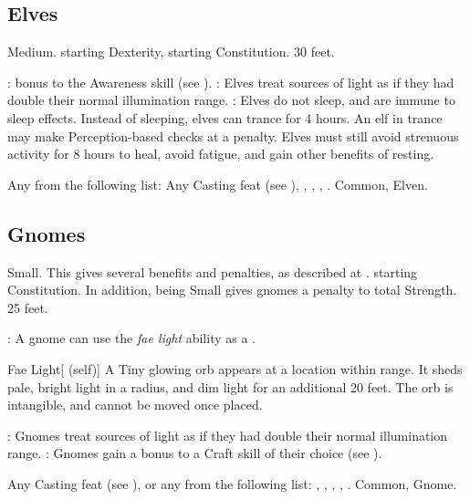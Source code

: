\subsection{Elves}
 Medium.
  starting Dexterity,  starting Constitution.
 30 feet.
\begin{itemize}
    :  bonus to the Awareness skill (see ).
    : Elves treat sources of light as if they had double their normal illumination range.
    : Elves do not sleep, and are immune to sleep effects. Instead of sleeping, elves can trance for 4 hours. An elf in trance may make Perception-based checks at a  penalty. Elves must still avoid strenuous activity for 8 hours to heal, avoid fatigue, and gain other benefits of resting.
\end{itemize}
 Any from the following list: Any Casting feat (see ), , , , .
 Common, Elven.

\subsection{Gnomes}
 Small. This gives several benefits and penalties, as described at .
  starting Constitution. In addition, being Small gives gnomes a  penalty to total Strength.
 25 feet.
\begin{itemize}
    : A gnome can use the \textit{fae light} ability as a .
        \begin{attuneability}{Fae Light}[ (self)]
            A Tiny glowing orb appears at a location within \rngmed range.
            It sheds pale, bright light in a \areamed radius, and dim light for an additional 20 feet.
            The orb is intangible, and cannot be moved once placed.
        \end{attuneability}
    : Gnomes treat sources of light as if they had double their normal illumination range.
    : Gnomes gain a  bonus to a Craft skill of their choice (see ).
\end{itemize}
 Any Casting feat (see ), or any from the following list: , , , , .
 Common, Gnome.

